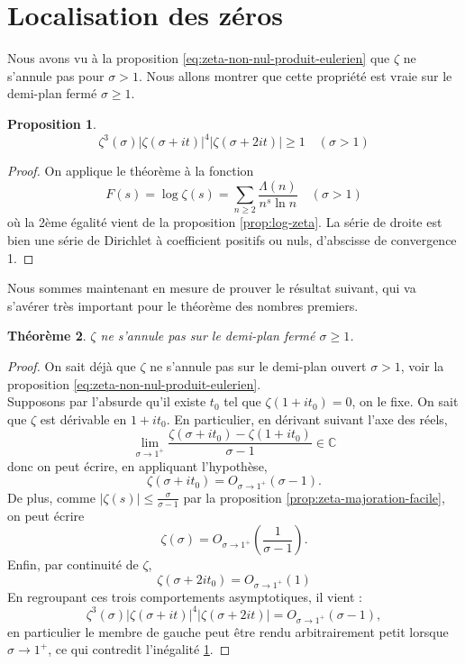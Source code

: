 \documentclass[french]{report}
\newtheorem{theorem}{Théorème}[section]
\newtheorem{proposition}[theorem]{Proposition}
\begin{document}
\section{Localisation des zéros}\label{section:localisation-zeros}

Nous avons vu à la proposition \ref{eq:zeta-non-nul-produit-eulerien} que $\zeta$ ne s'annule pas pour $\sigma>1$. Nous allons montrer que cette propriété est vraie sur le demi-plan fermé $\sigma\geq1$.

\begin{proposition}\label{prop:zeta-inegalite-1}
  \[ \zeta^3(\sigma)|\zeta(\sigma+it)|^4|\zeta(\sigma+2it)|\geq1\quad(\sigma>1) \]  
\end{proposition}

\begin{proof}
  On applique le théorème à la fonction
  \[ F(s) = \log\zeta(s) = \sum_{n\geq2}\frac{\Lambda(n)}{n^s\ln n}\quad(\sigma>1) \]
  où la 2ème égalité vient de la proposition \ref{prop:log-zeta}. La série de droite est bien une série de Dirichlet à coefficient positifs ou nuls, d'abscisse de convergence 1.
\end{proof}

Nous sommes maintenant en mesure de prouver le résultat suivant, qui va s'avérer très important pour le théorème des nombres premiers.

\begin{theorem}\label{eq:zeta-non-nul-demi-plan-ferme}
  $\zeta$ ne s'annule pas sur le demi-plan fermé $\sigma\geq1$.
\end{theorem}

\begin{proof}
  On sait déjà que $\zeta$ ne s'annule pas sur le demi-plan ouvert $\sigma>1$, voir la proposition \ref{eq:zeta-non-nul-produit-eulerien}.
  \\

  Supposons par l'absurde qu'il existe $t_0$ tel que $\zeta(1+it_0)=0$, on le fixe. On sait que $\zeta$ est dérivable en $1+it_0$. En particulier, en dérivant suivant l'axe des réels,
  \[ \lim_{\sigma\to1^+}\frac{\zeta(\sigma+it_0)-\zeta(1+it_0)}{\sigma-1}\in\mathbb{C}\]
  donc on peut écrire, en appliquant l'hypothèse,
  \[ \zeta(\sigma+it_0)=O_{\sigma\to1^+}(\sigma-1). \]
  De plus, comme $|\zeta(s)|\leq\frac{\sigma}{\sigma-1}$ par la proposition \ref{prop:zeta-majoration-facile}, on peut écrire
  \[ \zeta(\sigma) = O_{\sigma\to1^+}\left(\frac{1}{\sigma-1}\right). \]
  Enfin, par continuité de $\zeta$,
  \[ \zeta(\sigma+2it_0) = O_{\sigma\to1^+}(1) \]
  En regroupant ces trois comportements asymptotiques, il vient :
  \[ \zeta^3(\sigma)|\zeta(\sigma+it)|^4|\zeta(\sigma+2it)| = O_{\sigma\to1^+}(\sigma-1), \]
  en particulier le membre de gauche peut être rendu arbitrairement petit lorsque $\sigma\to1^+$, ce qui contredit l'inégalité \ref{prop:zeta-inegalite-1}.
\end{proof}
\end{document}
